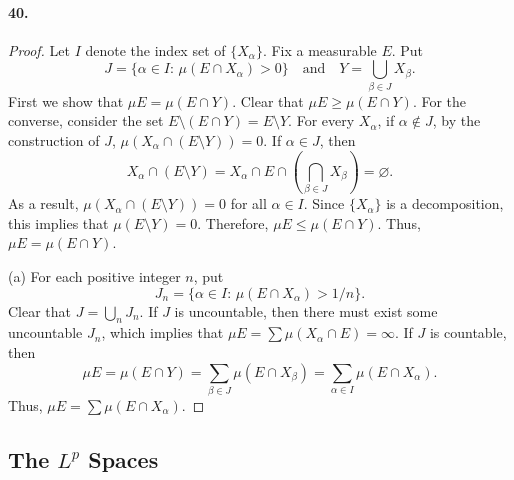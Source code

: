  \paragraph{40.}
  \begin{proof}
    Let $I$ denote the index set of $\{X_\alpha\}$. Fix a measurable $E$. Put
    \[
      J=\{\alpha\in I:\,\mu(E\cap X_\alpha)>0\}
      \quad\text{and}\quad
      Y=\bigcup_{\beta\in J}X_\beta.
    \]
    First we show that $\mu E=\mu(E\cap Y)$. Clear that $\mu E\ge\mu(E\cap Y)$.
    For the converse, consider the set $E\setminus(E\cap Y)=E\setminus Y$. For
    every $X_\alpha$, if $\alpha\notin J$, by the construction of $J$, $\mu(
    X_\alpha\cap(E\setminus Y))=0$. If $\alpha\in J$, then
    \[
      X_\alpha\cap(E\setminus Y)=
      X_\alpha\cap E\cap\left(\bigcap_{\beta\in J}X_\beta\right)=
      \varnothing.
    \]
    As a result, $\mu(X_\alpha\cap(E\setminus Y))=0$ for all $\alpha\in I$. 
    Since $\{X_\alpha\}$ is a decomposition, this implies that $\mu(E\setminus 
    Y)=0$. Therefore, $\mu E\le \mu(E\cap Y)$. Thus, $\mu E=\mu(E\cap Y)$.\par
    (a) For each positive integer $n$, put
    \[
      J_n=\{\alpha\in I:\,\mu(E\cap X_\alpha)>1/n\}.
    \]
    Clear that $J=\bigcup_n J_n$. If $J$ is uncountable, then there must exist
    some uncountable $J_n$, which implies that $\mu E=\sum\mu(X_\alpha\cap E)=
    \infty$. If $J$ is countable, then
    \[
      \mu E=\mu(E\cap Y)=\sum_{\beta\in J}\mu(E\cap X_\beta)=
      \sum_{\alpha\in I}\mu(E\cap X_\alpha).
    \]
    Thus, $\mu E=\sum\mu(E\cap X_\alpha)$.
  \end{proof}
\subsection{The $L^p$ Spaces}
